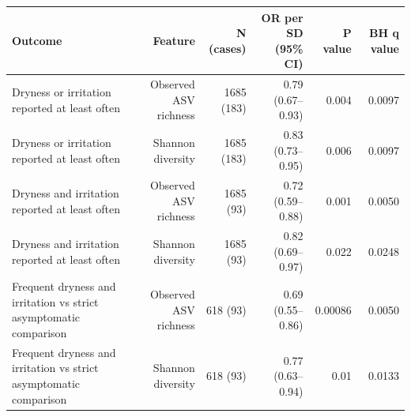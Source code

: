 \begin{tabular}{lrrrrr}
\toprule
Outcome & Feature & N (cases) & OR per SD (95\% CI) & P value & BH q value \\
\midrule
Dryness or irritation reported at least often & Observed ASV richness & 1685 (183) & 0.79 (0.67--0.93) & 0.004 & 0.0097 \\
Dryness or irritation reported at least often & Shannon diversity & 1685 (183) & 0.83 (0.73--0.95) & 0.006 & 0.0097 \\
Dryness and irritation reported at least often & Observed ASV richness & 1685 (93) & 0.72 (0.59--0.88) & 0.001 & 0.0050 \\
Dryness and irritation reported at least often & Shannon diversity & 1685 (93) & 0.82 (0.69--0.97) & 0.022 & 0.0248 \\
Frequent dryness and irritation vs strict asymptomatic comparison & Observed ASV richness & 618 (93) & 0.69 (0.55--0.86) & 0.00086 & 0.0050 \\
Frequent dryness and irritation vs strict asymptomatic comparison & Shannon diversity & 618 (93) & 0.77 (0.63--0.94) & 0.01 & 0.0133 \\
\bottomrule
\end{tabular}
